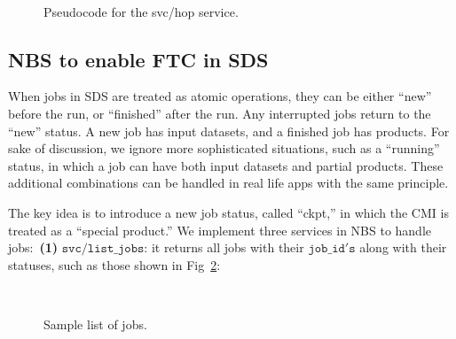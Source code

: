 \documentclass[conference]{IEEEtran}
\begin{document}
\begin{figure}[!ht]
\begin{center}
\begin{center}
\mbox{}\\[0.3em]
\end{center}
\hspace{\fill}%
\caption{Pseudocode for the svc/hop service.}
\label{code:svc_hop}
\end{center}
\end{figure}


\subsection{NBS to enable FTC in SDS}
\label{subsec:s23}

When jobs in SDS are treated as atomic operations, they can be either ``new'' before the run, or ``finished'' after the run. Any interrupted jobs return to the ``new'' status. A new job has input datasets, and a finished job has products. For sake of discussion, we ignore more sophisticated situations, such as a ``running'' status, in which a job can have both input datasets and partial products. These additional combinations can be handled in real life apps with the same principle.

The key idea is to introduce a new job status, called ``ckpt,'' in which the CMI is treated as a ``special product.'' We implement three services in NBS to handle jobs:~\textbf{(1)} $\mathtt{svc/list\_jobs}$: it returns all jobs with their $\mathtt{job\_id's}$ along with their statuses, such as those shown in Fig~\ref{code:jobs}:

\begin{figure}[!ht]
\begin{center}
\begin{center}
\mbox{}\\[0.3em]
\end{center}
\hspace{\fill}%
\caption{Sample list of jobs.}
\label{code:jobs}
\end{center}
\end{figure}
\end{document}
